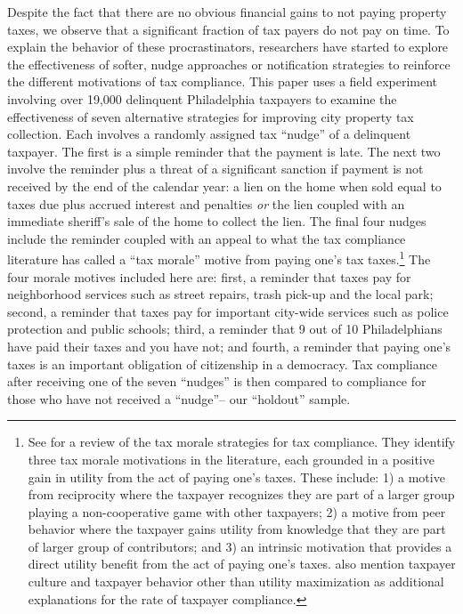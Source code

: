 \documentclass[12pt]{article}
\begin{document}
Despite the fact that there are no obvious financial gains to not
paying property taxes, we observe that a significant fraction of tax
payers do not pay on time. To explain the behavior of these
procrastinators, researchers have started to explore the effectiveness
of softer, nudge approaches or notification strategies to reinforce
the different motivations of tax compliance.  This paper uses a field
experiment involving over 19,000 delinquent Philadelphia taxpayers to
examine the effectiveness of seven alternative strategies for
improving city property tax collection. Each involves a randomly
assigned tax ``nudge'' of a delinquent taxpayer.  The first is a
simple reminder that the payment is late.  The next two involve the
reminder plus a threat of a significant sanction if payment is not
received by the end of the calendar year: a lien on the home when sold
equal to taxes due plus accrued interest and penalties \textit{or} the
lien coupled with an immediate sheriff's sale of the home to collect
the lien.  The final four nudges include the reminder coupled with an
appeal to what the tax compliance literature has called a ``tax
morale'' motive from paying one's tax taxes.\footnote{See
   for a review of the tax morale strategies for tax
  compliance.  They identify three tax morale motivations in the
  literature, each grounded in a positive gain in utility from the act
  of paying one's taxes.  These include: 1) a motive from reciprocity
  where the taxpayer recognizes they are part of a larger group
  playing a non-cooperative game with other taxpayers; 2) a motive
  from peer behavior where the taxpayer gains utility from knowledge
  that they are part of larger group of contributors; and 3) an
  intrinsic motivation that provides a direct utility benefit from the
  act of paying one's taxes.   also mention taxpayer
  culture and taxpayer behavior other than utility maximization as
  additional explanations for the rate of taxpayer compliance. }  The
four morale motives included here are: first, a reminder that taxes
pay for neighborhood services such as street repairs, trash pick-up
and the local park; second, a reminder that taxes pay for important
city-wide services such as police protection and public schools;
third, a reminder that 9 out of 10 Philadelphians have paid their
taxes and you have not; and fourth, a reminder that paying one's taxes
is an important obligation of citizenship in a democracy.  Tax
compliance after receiving one of the seven ``nudges'' is then
compared to compliance for those who have not received a ``nudge''--
our ``holdout'' sample.
\end{document}
